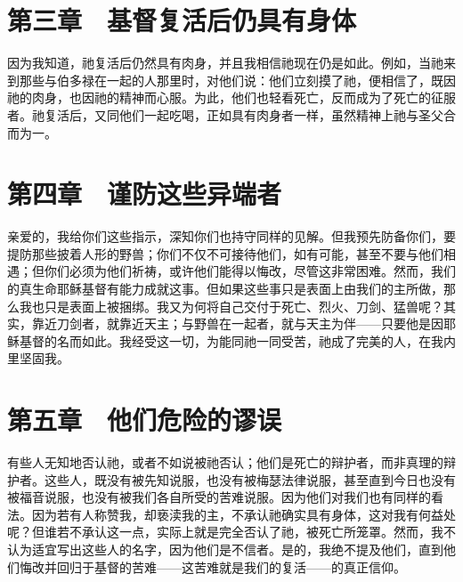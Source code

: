 
\section{第三章　基督复活后仍具有身体}

因为我知道，祂复活后仍然具有肉身，并且我相信祂现在仍是如此。例如，当祂来到那些与伯多禄在一起的人那里时，对他们说：他们立刻摸了祂，便相信了，既因祂的肉身，也因祂的精神而心服。为此，他们也轻看死亡，反而成为了死亡的征服者。祂复活后，又同他们一起吃喝，正如具有肉身者一样，虽然精神上祂与圣父合而为一。\par


\section{第四章　谨防这些异端者}

亲爱的，我给你们这些指示，深知你们也持守同样的见解。但我预先防备你们，要提防那些披着人形的野兽；你们不仅不可接待他们，如有可能，甚至不要与他们相遇；但你们必须为他们祈祷，或许他们能得以悔改，尽管这非常困难。然而，我们的真生命耶稣基督有能力成就这事。但如果这些事只是表面上由我们的主所做，那么我也只是表面上被捆绑。我又为何将自己交付于死亡、烈火、刀剑、猛兽呢？其实，靠近刀剑者，就靠近天主；与野兽在一起者，就与天主为伴——只要他是因耶稣基督的名而如此。我经受这一切，为能同祂一同受苦，祂成了完美的人，在我内里坚固我。\par


\section{第五章　他们危险的谬误}

有些人无知地否认祂，或者不如说被祂否认；他们是死亡的辩护者，而非真理的辩护者。这些人，既没有被先知说服，也没有被梅瑟法律说服，甚至直到今日也没有被福音说服，也没有被我们各自所受的苦难说服。因为他们对我们也有同样的看法。因为若有人称赞我，却亵渎我的主，不承认祂确实具有身体，这对我有何益处呢？但谁若不承认这一点，实际上就是完全否认了祂，被死亡所笼罩。然而，我不认为适宜写出这些人的名字，因为他们是不信者。是的，我绝不提及他们，直到他们悔改并回归于基督的苦难——这苦难就是我们的复活——的真正信仰。\par

